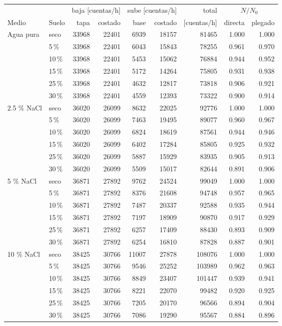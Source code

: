 \begin{tabular}{ll rrrr r rr}
\toprule
 & & \multicolumn{2}{c}{baja [cuentas/h]} & \multicolumn{2}{c}{sube [cuentas/h]} & total & \multicolumn{2}{c}{$N/N_0$} \\
\cmidrule(lr){3-4}\cmidrule(lr){5-6}\cmidrule(lr){8-9}
Medio & Suelo & tapa & costado & base & costado & [cuentas/h] & directa & plegado \\
\midrule
Agua pura & seco & 33968 & 22401 & 6939 & 18157 & 81465 & 1.000 & 1.000 \\
 & 5\,\% & 33968 & 22401 & 6043 & 15843 & 78255 & 0.961 & 0.970 \\
 & 10\,\% & 33968 & 22401 & 5453 & 15062 & 76884 & 0.944 & 0.952 \\
 & 15\,\% & 33968 & 22401 & 5172 & 14264 & 75805 & 0.931 & 0.938 \\
 & 25\,\% & 33968 & 22401 & 4632 & 12817 & 73818 & 0.906 & 0.921 \\
 & 30\,\% & 33968 & 22401 & 4559 & 12393 & 73322 & 0.900 & 0.914 \\
\midrule
2.5 \% NaCl & seco & 36020 & 26099 & 8632 & 22025 & 92776 & 1.000 & 1.000 \\
 & 5\,\% & 36020 & 26099 & 7463 & 19495 & 89077 & 0.960 & 0.967 \\
 & 10\,\% & 36020 & 26099 & 6824 & 18619 & 87561 & 0.944 & 0.946 \\
 & 15\,\% & 36020 & 26099 & 6402 & 17284 & 85805 & 0.925 & 0.932 \\
 & 25\,\% & 36020 & 26099 & 5887 & 15929 & 83935 & 0.905 & 0.913 \\
 & 30\,\% & 36020 & 26099 & 5509 & 15017 & 82644 & 0.891 & 0.906 \\
\midrule
5 \% NaCl & seco & 36871 & 27892 & 9762 & 24524 & 99049 & 1.000 & 1.000 \\
 & 5\,\% & 36871 & 27892 & 8376 & 21608 & 94748 & 0.957 & 0.965 \\
 & 10\,\% & 36871 & 27892 & 7487 & 20337 & 92588 & 0.935 & 0.944 \\
 & 15\,\% & 36871 & 27892 & 7197 & 18909 & 90870 & 0.917 & 0.929 \\
 & 25\,\% & 36871 & 27892 & 6257 & 17409 & 88430 & 0.893 & 0.909 \\
 & 30\,\% & 36871 & 27892 & 6254 & 16810 & 87828 & 0.887 & 0.901 \\
\midrule
10 \% NaCl & seco & 38425 & 30766 & 11007 & 27878 & 108076 & 1.000 & 1.000 \\
 & 5\,\% & 38425 & 30766 & 9546 & 25252 & 103989 & 0.962 & 0.963 \\
 & 10\,\% & 38425 & 30766 & 8849 & 23407 & 101447 & 0.939 & 0.941 \\
 & 15\,\% & 38425 & 30766 & 8221 & 22070 & 99482 & 0.920 & 0.925 \\
 & 25\,\% & 38425 & 30766 & 7205 & 20170 & 96566 & 0.894 & 0.904 \\
 & 30\,\% & 38425 & 30766 & 7086 & 19290 & 95567 & 0.884 & 0.896 \\
\bottomrule
\end{tabular}

